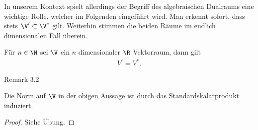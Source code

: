 \par
In unserem Kontext spielt allerdings der Begriff des algebraischen Dualraums eine wichtige Rolle, welcher im Folgenden eingeführt wird. Man erkennt sofort, dass stets \(\V^\prime\subset \V^\ast\) gilt. Weiterhin stimmen die beiden Räume im endlich dimensionalen Fall überein.
\label{vektoranalysis/multilinear:lemma-3}
\begin{lemma}{}{}



\par
Für \(n\in\N\) sei \(\V\) ein \(n\) dimensionaler \(\R\) Vektorraum, dann gilt
\begin{align*}
V^\prime = V^\ast.
\end{align*}\end{lemma}
\label{vektoranalysis/multilinear:remark-4}
\begin{emphBox}{}{}{Remark 3.2}



\par
Die Norm auf \(\V\) in der obigen Aussage ist durch das Standardskalarprodukt induziert.
\end{emphBox}

\begin{proof}
 Siehe Übung.
\end{proof}


